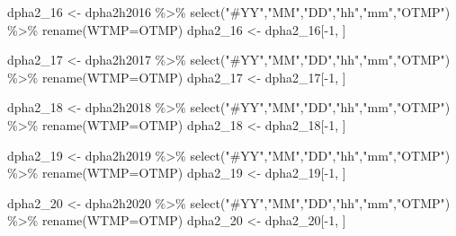 \documentclass[
  letterpaper,
  DIV=11,
  numbers=noendperiod]{scrreprt}
\newenvironment{Shaded}{\begin{snugshade}}{\end{snugshade}}
\newcommand{\AttributeTok}[1]{\textcolor[rgb]{0.40,0.45,0.13}{#1}}
\newcommand{\DecValTok}[1]{\textcolor[rgb]{0.68,0.00,0.00}{#1}}
\newcommand{\FunctionTok}[1]{\textcolor[rgb]{0.28,0.35,0.67}{#1}}
\newcommand{\NormalTok}[1]{\textcolor[rgb]{0.00,0.23,0.31}{#1}}
\newcommand{\OtherTok}[1]{\textcolor[rgb]{0.00,0.23,0.31}{#1}}
\newcommand{\SpecialCharTok}[1]{\textcolor[rgb]{0.37,0.37,0.37}{#1}}
\newcommand{\StringTok}[1]{\textcolor[rgb]{0.13,0.47,0.30}{#1}}
\begin{document}
\begin{Shaded}
\begin{Highlighting}[]
\NormalTok{dpha2\_16 }\OtherTok{\textless{}{-}}\NormalTok{ dpha2h2016 }\SpecialCharTok{\%\textgreater{}\%} \FunctionTok{select}\NormalTok{(}\StringTok{"\#YY"}\NormalTok{,}\StringTok{"MM"}\NormalTok{,}\StringTok{"DD"}\NormalTok{,}\StringTok{"hh"}\NormalTok{,}\StringTok{"mm"}\NormalTok{,}\StringTok{"OTMP"}\NormalTok{) }\SpecialCharTok{\%\textgreater{}\%}
   \FunctionTok{rename}\NormalTok{(}\AttributeTok{WTMP=}\NormalTok{OTMP)}
\NormalTok{dpha2\_16 }\OtherTok{\textless{}{-}}\NormalTok{ dpha2\_16[}\SpecialCharTok{{-}}\DecValTok{1}\NormalTok{, ] }

\NormalTok{dpha2\_17 }\OtherTok{\textless{}{-}}\NormalTok{ dpha2h2017 }\SpecialCharTok{\%\textgreater{}\%} \FunctionTok{select}\NormalTok{(}\StringTok{"\#YY"}\NormalTok{,}\StringTok{"MM"}\NormalTok{,}\StringTok{"DD"}\NormalTok{,}\StringTok{"hh"}\NormalTok{,}\StringTok{"mm"}\NormalTok{,}\StringTok{"OTMP"}\NormalTok{) }\SpecialCharTok{\%\textgreater{}\%}
  \FunctionTok{rename}\NormalTok{(}\AttributeTok{WTMP=}\NormalTok{OTMP)}
\NormalTok{dpha2\_17 }\OtherTok{\textless{}{-}}\NormalTok{ dpha2\_17[}\SpecialCharTok{{-}}\DecValTok{1}\NormalTok{, ]}

\NormalTok{dpha2\_18 }\OtherTok{\textless{}{-}}\NormalTok{ dpha2h2018 }\SpecialCharTok{\%\textgreater{}\%} \FunctionTok{select}\NormalTok{(}\StringTok{"\#YY"}\NormalTok{,}\StringTok{"MM"}\NormalTok{,}\StringTok{"DD"}\NormalTok{,}\StringTok{"hh"}\NormalTok{,}\StringTok{"mm"}\NormalTok{,}\StringTok{"OTMP"}\NormalTok{) }\SpecialCharTok{\%\textgreater{}\%}
  \FunctionTok{rename}\NormalTok{(}\AttributeTok{WTMP=}\NormalTok{OTMP)}
\NormalTok{dpha2\_18 }\OtherTok{\textless{}{-}}\NormalTok{ dpha2\_18[}\SpecialCharTok{{-}}\DecValTok{1}\NormalTok{, ]}

\NormalTok{dpha2\_19 }\OtherTok{\textless{}{-}}\NormalTok{ dpha2h2019 }\SpecialCharTok{\%\textgreater{}\%} \FunctionTok{select}\NormalTok{(}\StringTok{"\#YY"}\NormalTok{,}\StringTok{"MM"}\NormalTok{,}\StringTok{"DD"}\NormalTok{,}\StringTok{"hh"}\NormalTok{,}\StringTok{"mm"}\NormalTok{,}\StringTok{"OTMP"}\NormalTok{) }\SpecialCharTok{\%\textgreater{}\%}
  \FunctionTok{rename}\NormalTok{(}\AttributeTok{WTMP=}\NormalTok{OTMP)}
\NormalTok{dpha2\_19 }\OtherTok{\textless{}{-}}\NormalTok{ dpha2\_19[}\SpecialCharTok{{-}}\DecValTok{1}\NormalTok{, ]}

\NormalTok{dpha2\_20 }\OtherTok{\textless{}{-}}\NormalTok{ dpha2h2020 }\SpecialCharTok{\%\textgreater{}\%} \FunctionTok{select}\NormalTok{(}\StringTok{"\#YY"}\NormalTok{,}\StringTok{"MM"}\NormalTok{,}\StringTok{"DD"}\NormalTok{,}\StringTok{"hh"}\NormalTok{,}\StringTok{"mm"}\NormalTok{,}\StringTok{"OTMP"}\NormalTok{) }\SpecialCharTok{\%\textgreater{}\%}
  \FunctionTok{rename}\NormalTok{(}\AttributeTok{WTMP=}\NormalTok{OTMP)}
\NormalTok{dpha2\_20 }\OtherTok{\textless{}{-}}\NormalTok{ dpha2\_20[}\SpecialCharTok{{-}}\DecValTok{1}\NormalTok{, ]}


\end{Highlighting}
\end{Shaded}
\end{document}
